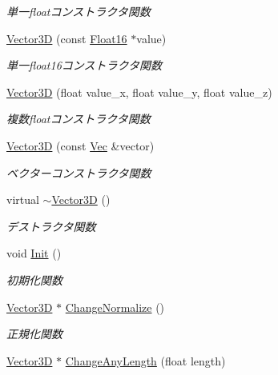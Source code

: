 \begin{DoxyCompactItemize}
\begin{DoxyCompactList}\small\item\em 単一floatコンストラクタ関数 \end{DoxyCompactList}\item 
\mbox{\hyperlink{class_vector3_d_a62a6c07e15fa66cb220fb3e511582683}{Vector3D}} (const \mbox{\hyperlink{_vector3_d_8h_afe61185afc2bf3856c12613d99eede01}{Float16}} $\ast$value)
\begin{DoxyCompactList}\small\item\em 単一float16コンストラクタ関数 \end{DoxyCompactList}\item 
\mbox{\hyperlink{class_vector3_d_abe8fbafd6d5d8b44f1c79fe3f135cc71}{Vector3D}} (float value\+\_\+x, float value\+\_\+y, float value\+\_\+z)
\begin{DoxyCompactList}\small\item\em 複数floatコンストラクタ関数 \end{DoxyCompactList}\item 
\mbox{\hyperlink{class_vector3_d_a446893e1b89f6e60ea16cf30ef0a3afc}{Vector3D}} (const \mbox{\hyperlink{_vector3_d_8h_a1f0b707f0d418d6cc74484019e41e55d}{Vec}} \&vector)
\begin{DoxyCompactList}\small\item\em ベクターコンストラクタ関数 \end{DoxyCompactList}\item 
virtual \mbox{\hyperlink{class_vector3_d_ae4fde5759270bf5bcf615f12f0823a8c}{$\sim$\+Vector3D}} ()
\begin{DoxyCompactList}\small\item\em デストラクタ関数 \end{DoxyCompactList}\item 
void \mbox{\hyperlink{class_vector3_d_a5a150ccb85382a0926661ac17e080525}{Init}} ()
\begin{DoxyCompactList}\small\item\em 初期化関数 \end{DoxyCompactList}\item 
\mbox{\hyperlink{class_vector3_d}{Vector3D}} $\ast$ \mbox{\hyperlink{class_vector3_d_a43de085342dac1c57c5f66f0d6e6ef66}{Change\+Normalize}} ()
\begin{DoxyCompactList}\small\item\em 正規化関数 \end{DoxyCompactList}\item 
\mbox{\hyperlink{class_vector3_d}{Vector3D}} $\ast$ \mbox{\hyperlink{class_vector3_d_a3972641a984580d5dc12d219ab6c1ffe}{Change\+Any\+Length}} (float length)

\end{DoxyCompactItemize}
